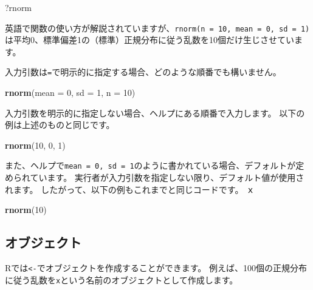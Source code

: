 \documentclass[]{bxjsarticle}
\newenvironment{Shaded}{\begin{snugshade}}{\end{snugshade}}
\newcommand{\DataTypeTok}[1]{\textcolor[rgb]{0.13,0.29,0.53}{#1}}
\newcommand{\DecValTok}[1]{\textcolor[rgb]{0.00,0.00,0.81}{#1}}
\newcommand{\KeywordTok}[1]{\textcolor[rgb]{0.13,0.29,0.53}{\textbf{#1}}}
\newcommand{\NormalTok}[1]{#1}
\begin{document}
\begin{Shaded}
\begin{Highlighting}[]
\NormalTok{?rnorm}
\end{Highlighting}
\end{Shaded}

英語で関数の使い方が解説されていますが、\texttt{rnorm(n\ =\ 10,\ mean\ =\ 0,\ sd\ =\ 1)}は平均0、標準偏差1の（標準）正規分布に従う乱数を10個だけ生じさせています。

入力引数は\texttt{=}で明示的に指定する場合、どのような順番でも構いません。

\begin{Shaded}
\begin{Highlighting}[]
\KeywordTok{rnorm}\NormalTok{(}\DataTypeTok{mean =} \DecValTok{0}\NormalTok{, }\DataTypeTok{sd =} \DecValTok{1}\NormalTok{, }\DataTypeTok{n =} \DecValTok{10}\NormalTok{)}
\end{Highlighting}
\end{Shaded}

入力引数を明示的に指定しない場合、ヘルプにある順番で入力します。
以下の例は上述のものと同じです。

\begin{Shaded}
\begin{Highlighting}[]
\KeywordTok{rnorm}\NormalTok{(}\DecValTok{10}\NormalTok{, }\DecValTok{0}\NormalTok{, }\DecValTok{1}\NormalTok{)}
\end{Highlighting}
\end{Shaded}

また、ヘルプで\texttt{mean\ =\ 0,\ sd\ =\ 1}のように書かれている場合、デフォルトが定められています。
実行者が入力引数を指定しない限り、デフォルト値が使用されます。
したがって、以下の例もこれまでと同じコードです。
ｘ

\begin{Shaded}
\begin{Highlighting}[]
\KeywordTok{rnorm}\NormalTok{(}\DecValTok{10}\NormalTok{)}
\end{Highlighting}
\end{Shaded}

\hypertarget{ux30aaux30d6ux30b8ux30a7ux30afux30c8}{%
\subsection{オブジェクト}\label{ux30aaux30d6ux30b8ux30a7ux30afux30c8}}

Rでは\texttt{\textless{}-}でオブジェクトを作成することができます。
例えば、100個の正規分布に従う乱数を\texttt{x}という名前のオブジェクトとして作成します。
\end{document}
